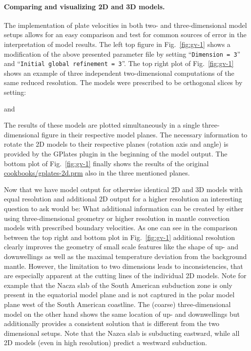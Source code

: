 \documentclass{article}
\begin{document}
\paragraph{Comparing and visualizing 2D and 3D models.}

The implementation of plate velocities in both two- and three-dimensional model
setups allows for an easy comparison and test for common sources of error
in the interpretation of model results. The left top figure in Fig.~\ref{fig:gv-1} 
shows a modification of the above presented parameter file by setting 
``\texttt{Dimension = 3}'' and ``\texttt{Initial global refinement = 3}''. 
The top right plot of Fig.~\ref{fig:gv-1} shows an example of three independent 
two-dimensional computations of the same reduced resolution. The models were prescribed 
to be orthogonal slices by setting:


and



The results of these models are plotted simultaneously in a single three-dimensional figure
in their respective model planes. The necessary information 
to rotate the 2D models to their respective planes (rotation axis and angle) is provided by the 
GPlates plugin in the beginning of the model output.  The bottom plot 
of Fig.~\ref{fig:gv-1} finally shows the results of the original \url{cookbooks/gplates-2d.prm} 
also in the three mentioned planes. 

Now that we have model output for otherwise identical 2D and 3D models with equal resolution and additional 2D output
for a higher resolution an interesting question to ask would be: What additional information can be created by
either using three-dimensional geometry or higher resolution in mantle convection models with prescribed boundary velocities.
As one can see in the comparison between the top right and bottom plot in Fig.~\ref{fig:gv-1} additional resolution clearly
improves the geometry of small scale features like the shape of up- and downwellings as well as the maximal temperature
deviation from the background mantle. However, the limitation to two dimensions leads to inconsistencies, 
that are especially apparent at the cutting lines of the individual 2D models. 
Note for example that the Nacza slab of the South American subduction zone is only
present in the equatorial model plane and is not captured in the polar model plane west 
of the South American coastline. The (coarse) three-dimensional model on the other hand
shows the same location of up- and downwellings but additionally provides a consistent solution
that is different from the two dimensional setups. Note that the Nazca slab is subducting eastward,
while all 2D models (even in high resolution) predict a westward subduction.
\end{document}
